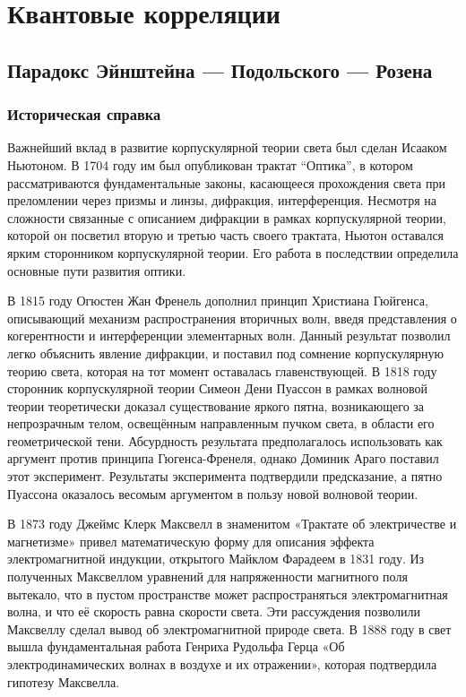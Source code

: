 \section{Квантовые корреляции}

\subsection{Парадокс Эйнштейна — Подольского — Розена}

\subsubsection{Историческая справка}

Важнейший вклад в развитие корпускулярной теории света был сделан Исааком Ньютоном.
В 1704 году им был опубликован трактат ``Оптика'',
в котором рассматриваются фундаментальные законы,
касающееся прохождения света при преломлении через призмы и линзы, дифракция, интерференция.
Несмотря на сложности связанные с описанием дифракции в рамках корпускулярной теории, которой он посветил вторую и третью часть своего трактата,
Ньютон оставался ярким сторонником корпускулярной теории.
Его работа в последствии определила основные пути развития оптики.

В 1815 году Огюстен Жан Френель дополнил принцип Христиана Гюйгенса,
описывающий механизм распространения вторичных волн,
введя представления о когерентности и интерференции элементарных волн.
Данный результат позволил легко объяснить явление дифракции,
и поставил под сомнение корпускулярную теорию света,
которая на тот момент оставалась главенствующей.
В 1818 году сторонник корпускулярной теории Симеон Дени Пуассон
в рамках волновой теории теоретически доказал существование яркого пятна,
возникающего за непрозрачным телом,
освещённым направленным пучком света,
в области его геометрической тени.
Абсурдность результата предполагалось использовать как аргумент против принципа Гюгенса-Френеля,
однако Доминик Араго поставил этот эксперимент.
Результаты эксперимента подтвердили предсказание,
а пятно Пуассона оказалось весомым аргументом в пользу новой волновой теории.

В 1873 году Джеймс Клерк Максвелл в знаменитом «Трактате об электричестве и магнетизме»
привел математическую форму для описания эффекта электромагнитной индукции,
открытого Майклом Фарадеем в 1831 году.
Из полученных Максвеллом уравнений для напряженности магнитного поля вытекало, что в пустом пространстве может распространяться электромагнитная волна, и что её скорость равна скорости света.
Эти рассуждения позволили Максвеллу сделал вывод об электромагнитной природе света.
В 1888 году в свет вышла фундаментальная работа Генриха Рудольфа Герца «Об электродинамических волнах в воздухе и их отражении»,
которая подтвердила гипотезу Максвелла.

